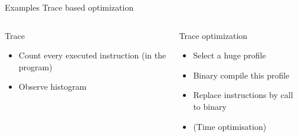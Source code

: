%
\begin{Frame}{Examples Trace based optimization}
  \begin{columns}[t]
    \begin{column}{5cm} %
      \begin{block}{Trace}
        \begin{itemize}
        \item Count every executed instruction (in the program)
        \item Observe histogram
        \end{itemize}
      \end{block} 
    \end{column}
    
    \begin{column}{5cm} %
      \begin{block}{Trace optimization}
        \begin{itemize}
        \item Select a huge profile
        \item Binary compile this profile
        \item Replace instructions by call to binary          
        \item (Time optimisation)
        \end{itemize}
      \end{block}   
    \end{column}
  \end{columns}  
\end{Frame}


